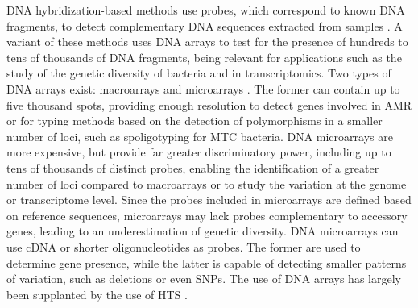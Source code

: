 \ac{DNA} hybridization-based methods use probes, which correspond to known \ac{DNA} fragments, to detect complementary \ac{DNA} sequences extracted from samples \cite{freeman_fundamentals_2000}. A variant of these methods uses \ac{DNA} arrays to test for the presence of hundreds to tens of thousands of \ac{DNA} fragments, being relevant for applications such as the study of the genetic diversity of bacteria and in transcriptomics. Two types of \ac{DNA} arrays exist: macroarrays \cite{gress_hybridization_1992, lennon_hybridization_1991} and microarrays \cite{derisi_use_1996, schena_quantitative_1995, shalon_dna_1996}. The former can contain up to five thousand spots, providing enough resolution to detect genes involved in \ac{AMR} or for typing methods based on the detection of polymorphisms in a smaller number of loci, such as spoligotyping for \ac{MTC} bacteria. \ac{DNA} microarrays are more expensive, but provide far greater discriminatory power, including up to tens of thousands of distinct probes, enabling the identification of a greater number of loci compared to macroarrays or to study the variation at the genome or transcriptome level. Since the probes included in microarrays are defined based on reference sequences, microarrays may lack probes complementary to accessory genes, leading to an underestimation of genetic diversity. \ac{DNA} microarrays can use \ac{cDNA} or shorter oligonucleotides as probes. The former are used to determine gene presence, while the latter is capable of detecting smaller patterns of variation, such as deletions or even \acp{SNP}. The use of \ac{DNA} arrays has largely been supplanted by the use of \ac{HTS} \cite{bumgarner_dna_2013}.

